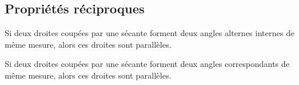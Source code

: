\documentclass[a4paper,10pt]{report}
\begin{document}
\vspace{-2mm}
\subsection{Propriétés réciproques}

\begin{prop}Si deux droites coupées par une sécante forment deux angles alternes internes de même mesure, alors ces droites sont parallèles.
\end{prop}

\begin{prop}Si deux droites coupées par une sécante forment deux angles correspondants de même
mesure, alors ces droites sont parallèles.
\end{prop}
\end{document}
